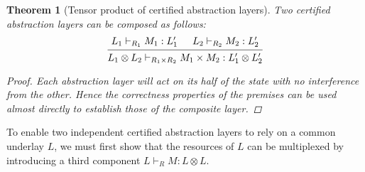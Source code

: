 \documentclass[11pt,oneside]{book}
\newtheorem{theorem}{Theorem}[chapter]
\theoremstyle{definition}
\begin{document}
\begin{theorem}[Tensor product of certified abstraction layers]
Two certified abstraction layers can be composed as follows:
\[
  \begin{prooftree}
    \hypo{L_1 \vdash_{R_1} M_1 : L_1'}
    \hypo{L_2 \vdash_{R_2} M_2 : L_2'}
    \infer2{L_1 \otimes L_2 \vdash_{R_1 \times R_2}
      M_1 \times M_2 : L_1' \otimes L_2'}
  \end{prooftree}
\]
\begin{proof}
Each abstraction layer
will act on its half of the state
with no interference from the other.
Hence the correctness properties
of the premises
can be used almost directly
to establish those of the composite layer.
\end{proof}
\end{theorem}

To enable two independent
certified abstraction layers
to rely on a common underlay $L$,
we must first show that the resources of $L$
can be multiplexed
by introducing a third component
$L \vdash_R M : L \otimes L$.
\end{document}

